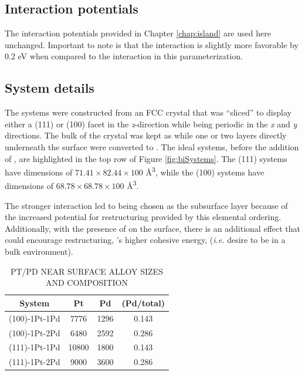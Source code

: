 \subsection{Interaction potentials}
The interaction potentials provided in Chapter \ref{chap:island} are used here unchanged.
\citep{Michalka:2015aa} Important to note is that
the  interaction is slightly more favorable by 0.2 eV 
when compared to the  interaction in this parameterization.

\subsection{System details}
The systems were constructed from an FCC  crystal that was ``sliced'' to
display either a (111) or (100) facet in the {\em z}-direction while being
periodic in the {\em x} and {\em y} directions. The bulk of the crystal was
kept as  while one or two layers directly underneath the surface were
converted to . The ideal systems, before the addition of , are
highlighted in the top row of Figure \ref{fig:biSystems}. The (111) systems
have dimensions of $71.41\times82.44\times100$ \AA\textsuperscript{3}, while
the (100) systems have dimensions of $68.78\times68.78\times100$ \AA\textsuperscript{3}.

The stronger  interaction led to  being chosen as the
subsurface layer because of the increased potential for restructuring provided
by this elemental ordering. Additionally, with the presence of  on the
surface, there is an additional effect that could encourage restructuring,
's higher cohesive energy, ({\em i.e.} desire to be in a bulk
environment).


\begin{table}
  \caption{PT/PD NEAR SURFACE ALLOY SIZES AND COMPOSITION}
  \centering
  \begin{threeparttable}
  \begin{tabular}{ c ccc }
  \hline
  \hline
  \textbf{System} & \textbf{Pt} & \textbf{Pd} &  \textbf{(Pd/total)} \\
  \hline
  (100)-1Pt-1Pd & 7776 & 1296  & 0.143 \\
  (100)-1Pt-2Pd & 6480  & 2592  & 0.286 \\
  (111)-1Pt-1Pd & 10800  & 1800  & 0.143 \\
  (111)-1Pt-2Pd & 9000 & 3600  & 0.286 \\
  \hline
  \hline
  \end{tabular}
  \end{threeparttable}
\label{tab:systems1}
\end{table}


